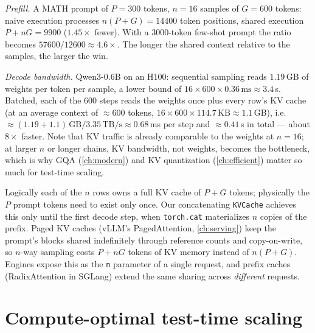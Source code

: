 \begin{napkinmath}
\emph{Prefill.} A MATH prompt of $P = 300$ tokens, $n = 16$ samples of $G = 600$ tokens: naive
execution processes $n(P + G) = \num{14400}$ token positions, shared execution $P + nG = \num{9900}$
($1.45\times$ fewer). With a 3000-token few-shot prompt the ratio becomes $\num{57600}/\num{12600}
\approx 4.6\times$. The longer the shared context relative to the samples, the larger the win.

\emph{Decode bandwidth.} Qwen3-0.6B on an H100: sequential sampling reads $1.19$\,GB of weights
per token per sample, a lower bound of $16 \times 600 \times 0.36\,\text{ms} \approx 3.4$\,s. Batched,
each of the 600 steps reads the weights once plus every row's KV cache (at an average context of
$\approx$600 tokens, $16 \times 600 \times 114.7\,\text{KB} \approx 1.1$\,GB), i.e.\
$\approx (1.19 + 1.1)\,\text{GB} / 3.35\,\text{TB/s} \approx 0.68$\,ms per step and
$\approx 0.41$\,s in total --- about $8\times$ faster. Note that KV traffic is already comparable to
the weights at $n = 16$; at larger $n$ or longer chains, KV bandwidth, not weights, becomes the
bottleneck, which is why GQA (\cref{ch:modern}) and KV quantization (\cref{ch:efficient}) matter
so much for test-time scaling.
\end{napkinmath}

\begin{systemslens}
Logically each of the $n$ rows owns a full KV cache of $P + G$ tokens; physically the $P$ prompt
tokens need to exist only once. Our concatenating \texttt{KVCache} achieves this only until the
first decode step, when \texttt{torch.cat} materializes $n$ copies of the prefix. Paged KV caches
(vLLM's PagedAttention, \cref{ch:serving}) keep the prompt's blocks shared indefinitely through
reference counts and copy-on-write, so $n$-way sampling costs $P + nG$ tokens of KV memory instead
of $n(P+G)$. Engines expose this as the \texttt{n} parameter of a single request, and prefix caches
(RadixAttention in SGLang) extend the same sharing across \emph{different} requests.
\end{systemslens}

\section{Compute-optimal test-time scaling}\label{sec:scaling:optimal}

